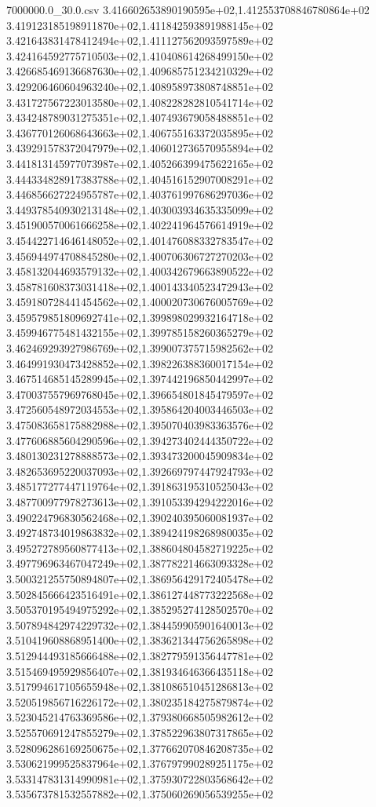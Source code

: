 \begin{filecontents*}{7000000.0_30.0.csv}
3.416602653890190595e+02,1.412553708846780864e+02
3.419123185198911870e+02,1.411842593891988145e+02
3.421643831478412494e+02,1.411127562093597589e+02
3.424164592775710503e+02,1.410408614268499150e+02
3.426685469136687630e+02,1.409685751234210329e+02
3.429206460604963240e+02,1.408958973808748851e+02
3.431727567223013580e+02,1.408228282810541714e+02
3.434248789031275351e+02,1.407493679058488851e+02
3.436770126068643663e+02,1.406755163372035895e+02
3.439291578372047979e+02,1.406012736570955894e+02
3.441813145977073987e+02,1.405266399475622165e+02
3.444334828917383788e+02,1.404516152907008291e+02
3.446856627224955787e+02,1.403761997686297036e+02
3.449378540930213148e+02,1.403003934635335099e+02
3.451900570061666258e+02,1.402241964576614919e+02
3.454422714646148052e+02,1.401476088332783547e+02
3.456944974708845280e+02,1.400706306727270203e+02
3.458132044693579132e+02,1.400342679663890522e+02
3.458781608373031418e+02,1.400143340523472943e+02
3.459180728441454562e+02,1.400020730676005769e+02
3.459579851809692741e+02,1.399898029932164718e+02
3.459946775481432155e+02,1.399785158260365279e+02
3.462469293927986769e+02,1.399007375715982562e+02
3.464991930473428852e+02,1.398226388360017154e+02
3.467514685145289945e+02,1.397442196850442997e+02
3.470037557969768045e+02,1.396654801845479597e+02
3.472560548972034553e+02,1.395864204003446503e+02
3.475083658175882988e+02,1.395070403983363576e+02
3.477606885604290596e+02,1.394273402444350722e+02
3.480130231278888573e+02,1.393473200045909834e+02
3.482653695220037093e+02,1.392669797447924793e+02
3.485177277447119764e+02,1.391863195310525043e+02
3.487700977978273613e+02,1.391053394294222016e+02
3.490224796830562468e+02,1.390240395060081937e+02
3.492748734019863832e+02,1.389424198268980035e+02
3.495272789560877413e+02,1.388604804582719225e+02
3.497796963467047249e+02,1.387782214663093328e+02
3.500321255750894807e+02,1.386956429172405478e+02
3.502845666423516491e+02,1.386127448773222568e+02
3.505370195494975292e+02,1.385295274128502570e+02
3.507894842974229732e+02,1.384459905901640013e+02
3.510419608868951400e+02,1.383621344756265898e+02
3.512944493185666488e+02,1.382779591356447781e+02
3.515469495929856407e+02,1.381934646366435118e+02
3.517994617105655948e+02,1.381086510451286813e+02
3.520519856716226172e+02,1.380235184275879874e+02
3.523045214763369586e+02,1.379380668505982612e+02
3.525570691247855279e+02,1.378522963807317865e+02
3.528096286169250675e+02,1.377662070846208735e+02
3.530621999525837964e+02,1.376797990289251175e+02
3.533147831314990981e+02,1.375930722803568642e+02
3.535673781532557882e+02,1.375060269056539255e+02

\end{filecontents*}
